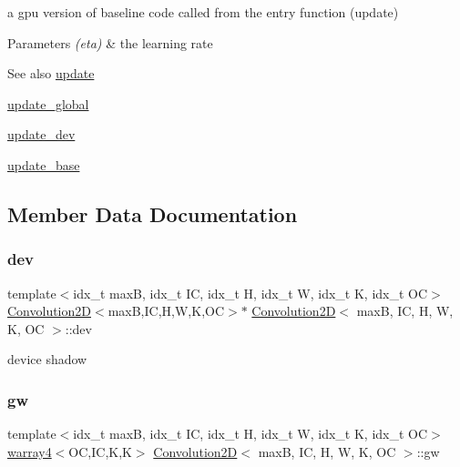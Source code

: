 a gpu version of baseline code called from the entry function (update) 


\begin{DoxyParams}{Parameters}
{\em (eta)} & the learning rate \\
\hline
\end{DoxyParams}
\begin{DoxySeeAlso}{See also}
\hyperlink{structConvolution2D_ac9fd666f96904bb7f62dc39cebae7a25}{update} 

\hyperlink{linear_8h_a810703be28422bb9483665cbdbafd968}{update\+\_\+global} 

\hyperlink{structConvolution2D_a724e0e31fb47f11af0f022adf983ca41}{update\+\_\+dev} 

\hyperlink{structConvolution2D_a5134826f56423c7629434f4c9ea40a1f}{update\+\_\+base} 
\end{DoxySeeAlso}


\subsection{Member Data Documentation}
\mbox{\label{structConvolution2D_a3b9891c27e266092619413a16518a9e9}} 
\subsubsection{\texorpdfstring{dev}{dev}}
{\footnotesize\ttfamily template$<$idx\+\_\+t maxB, idx\+\_\+t IC, idx\+\_\+t H, idx\+\_\+t W, idx\+\_\+t K, idx\+\_\+t OC$>$ \\
\hyperlink{structConvolution2D}{Convolution2D}$<$maxB,IC,H,W,K,OC$>$$\ast$ \hyperlink{structConvolution2D}{Convolution2D}$<$ maxB, IC, H, W, K, OC $>$\+::dev}

device shadow \mbox{\label{structConvolution2D_acbd8375eef9aa08bd061b3898dbdc403}} 
\subsubsection{\texorpdfstring{gw}{gw}}
{\footnotesize\ttfamily template$<$idx\+\_\+t maxB, idx\+\_\+t IC, idx\+\_\+t H, idx\+\_\+t W, idx\+\_\+t K, idx\+\_\+t OC$>$ \\
\hyperlink{structwarray4}{warray4}$<$OC,IC,K,K$>$ \hyperlink{structConvolution2D}{Convolution2D}$<$ maxB, IC, H, W, K, OC $>$\+::gw}

